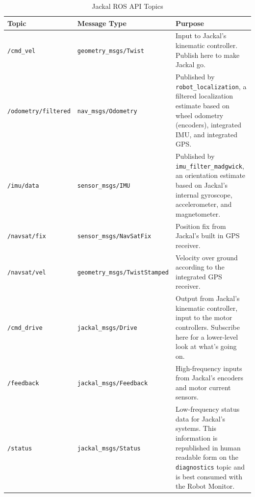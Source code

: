 \documentclass[]{clearpath-manual}
\begin{document}
\begin{table}[ht]
\begin{tabular}{  l  l  p{7cm} }
\hline
Topic & Message Type & Purpose \\ \hline

\lstinline{/cmd_vel} & \lstinline{geometry_msgs/Twist} & 
Input to Jackal's kinematic controller. Publish here to make Jackal go. \\ \hline
\lstinline{/odometry/filtered} & \lstinline{nav_msgs/Odometry} & 
Published by \lstinline{robot_localization}, a filtered localization estimate based
on wheel odometry (encoders), integrated IMU, and integrated GPS. \\ \hline

\lstinline{/imu/data} & \lstinline{sensor_msgs/IMU} & 
Published by \lstinline{imu_filter_madgwick}, an orientation estimate based on Jackal's
internal gyroscope, accelerometer, and magnetometer. \\ \hline
\lstinline{/navsat/fix} & \lstinline{sensor_msgs/NavSatFix} & 
Position fix from Jackal's built in GPS receiver. \\ \hline
\lstinline{/navsat/vel} & \lstinline{geometry_msgs/TwistStamped} & 
Velocity over ground according to the integrated GPS receiver.\\ \hline

\lstinline{/cmd_drive} & \lstinline{jackal_msgs/Drive} &
Output from Jackal's kinematic controller, input to the motor controllers. Subscribe here for a lower-level look at what's going on. \\ \hline
\lstinline{/feedback} & \lstinline{jackal_msgs/Feedback} &
High-frequency inputs from Jackal's encoders and motor current sensors. \\ \hline
\lstinline{/status} & \lstinline{jackal_msgs/Status} &
Low-frequency status data for Jackal's systems. This information is republished in human
readable form on the \lstinline{diagnostics} topic and is best consumed with the Robot
Monitor. \\ \hline
\end{tabular}
\caption{Jackal ROS API Topics}
\label{table:rosapi}
\end{table}

\end{document}
